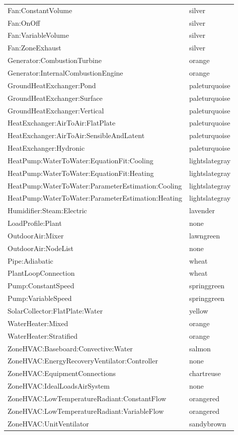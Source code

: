 \begin{longtable}[c]{@{}ll@{}}
Fan:ConstantVolume & silver \tabularnewline
Fan:OnOff & silver \tabularnewline
Fan:VariableVolume & silver \tabularnewline
Fan:ZoneExhaust & silver \tabularnewline
Generator:CombustionTurbine & orange \tabularnewline
Generator:InternalCombustionEngine & orange \tabularnewline
GroundHeatExchanger:Pond & paleturquoise \tabularnewline
GroundHeatExchanger:Surface & paleturquoise \tabularnewline
GroundHeatExchanger:Vertical & paleturquoise \tabularnewline
HeatExchanger:AirToAir:FlatPlate & paleturquoise \tabularnewline
HeatExchanger:AirToAir:SensibleAndLatent & paleturquoise \tabularnewline
HeatExchanger:Hydronic & paleturquoise \tabularnewline
HeatPump:WaterToWater:EquationFit:Cooling & lightslategray \tabularnewline
HeatPump:WaterToWater:EquationFit:Heating & lightslategray \tabularnewline
HeatPump:WaterToWater:ParameterEstimation:Cooling & lightslategray \tabularnewline
HeatPump:WaterToWater:ParameterEstimation:Heating & lightslategray \tabularnewline
Humidifier:Steam:Electric & lavender \tabularnewline
LoadProfile:Plant & none \tabularnewline
OutdoorAir:Mixer & lawngreen \tabularnewline
OutdoorAir:NodeList & none \tabularnewline
Pipe:Adiabatic & wheat \tabularnewline
PlantLoopConnection & wheat \tabularnewline
Pump:ConstantSpeed & springgreen \tabularnewline
Pump:VariableSpeed & springgreen \tabularnewline
SolarCollector:FlatPlate:Water & yellow \tabularnewline
WaterHeater:Mixed & orange \tabularnewline
WaterHeater:Stratified & orange \tabularnewline
ZoneHVAC:Baseboard:Convective:Water & salmon \tabularnewline
ZoneHVAC:EnergyRecoveryVentilator:Controller & none \tabularnewline
ZoneHVAC:EquipmentConnections & chartreuse \tabularnewline
ZoneHVAC:IdealLoadsAirSystem & none \tabularnewline
ZoneHVAC:LowTemperatureRadiant:ConstantFlow & orangered \tabularnewline
ZoneHVAC:LowTemperatureRadiant:VariableFlow & orangered \tabularnewline
ZoneHVAC:UnitVentilator & sandybrown \tabularnewline
\bottomrule
\end{longtable}

